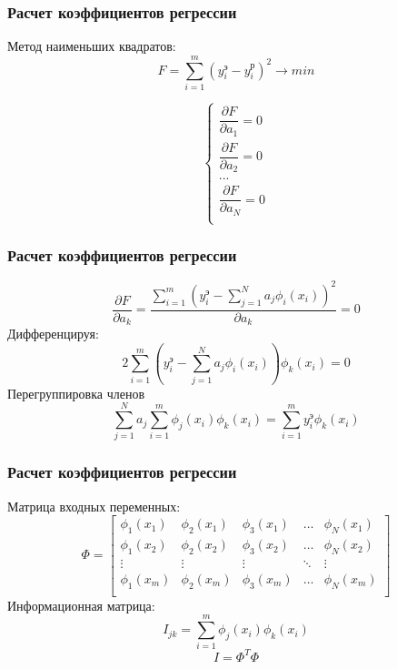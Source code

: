 \begin{frame}
	\frametitle{Расчет коэффициентов регрессии}
	Метод наименьших квадратов:
	\begin{equation}
		F=\sum_{i=1}^{m} (y_i^э- y_i^р)^2 \rightarrow min
	\end{equation}
	
	\begin{equation}
	\left\lbrace 
	\begin{gathered} 
	\dfrac{\partial F}{\partial a_1}=0 \\
	\dfrac{\partial F}{\partial a_2}=0 \\
	...\\
	\dfrac{\partial F}{\partial a_N}=0 \\
	\end{gathered} 
	\right.
	\end{equation}
\end{frame}

\begin{frame}
	\frametitle{Расчет коэффициентов регрессии}
	\begin{equation}
		\dfrac{\partial F}{\partial a_k} = \dfrac{\sum_{i=1}^{m} \left(
			y_i^э -\sum_{j=1}^{N} a_j \phi_i(x_i)
			 \right)^2}{\partial a_k} = 0
	\end{equation}
	Дифференцируя:
	\begin{equation}
		2 \sum_{i=1}^{m} \left(
		y_i^э -\sum_{j=1}^{N} a_j \phi_i(x_i)
		\right) \phi_k(x_i)=0
	\end{equation}
	Перегруппировка членов
	\begin{equation}\label{eq:l2eq}
		\sum_{j=1}^{N} a_j \sum_{i=1}^{m}\phi_j(x_i)\phi_k(x_i)=\sum_{i=1}^{m} y_i^э \phi_k(x_i)
	\end{equation}
	
\end{frame}

\begin{frame}
	\frametitle{Расчет коэффициентов регрессии}
	Матрица входных переменных:
	\begin{equation}
	\Phi = \begin{bmatrix}
	\phi_1(x_1) & \phi_2(x_1) & \phi_3(x_1) & \dots  & \phi_N(x_1) \\
	\phi_1(x_2) & \phi_2(x_2) & \phi_3(x_2) & \dots  & \phi_N(x_2) \\
	\vdots & \vdots & \vdots & \ddots & \vdots \\
	\phi_1(x_m) & \phi_2(x_m) & \phi_3(x_m) & \dots  & \phi_N(x_m) \\
	\end{bmatrix}
	\end{equation}
	Информационная матрица:
	\begin{equation}
	I_{jk} = \sum_{i=1}^{m} \phi_j (x_i) \phi_k (x_i)
	\end{equation}
	\begin{equation}
	I = \Phi^T \Phi
	\end{equation}
	
\end{frame}

